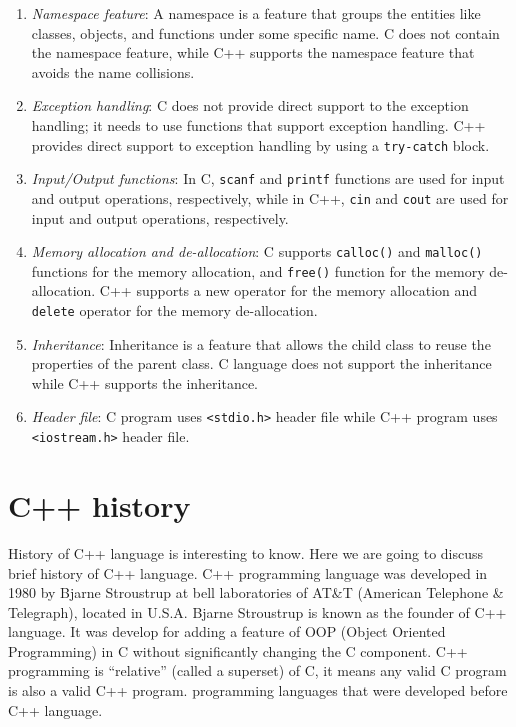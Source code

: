 \documentclass{book}
\begin{document}
\begin{enumerate}
\item \textit{Namespace feature}: A namespace is a feature that groups the entities like classes, objects, and functions under some specific name. C does not contain the namespace feature, while C++ supports the namespace feature that avoids the name collisions.
\item \textit{Exception handling}: C does not provide direct support to the exception handling; it needs to use functions that support exception handling. C++ provides direct support to exception handling by using a \texttt{try-catch} block.
\item \textit{Input/Output functions}: In C, \texttt{scanf} and \texttt{printf} functions are used for input and output operations, respectively, while in C++, \texttt{cin} and \texttt{cout} are used for input and output operations, respectively.
\item \textit{Memory allocation and de-allocation}: C supports \texttt{calloc()} and \texttt{malloc()} functions for the memory allocation, and \texttt{free()} function for the memory de-allocation. C++ supports a new operator for the memory allocation and \texttt{delete} operator for the memory de-allocation.
\item \textit{Inheritance}: Inheritance is a feature that allows the child class to reuse the properties of the parent class. C language does not support the inheritance while C++ supports the inheritance.
\item \textit{Header file}: C program uses \texttt{<stdio.h>} header file while C++ program uses \texttt{<iostream.h>} header file.
\end{enumerate}

\section{C++ history}

History of C++ language is interesting to know. Here we are going to discuss brief history of C++ language. C++ programming language was developed in 1980 by Bjarne Stroustrup at bell laboratories of AT&T (American Telephone & Telegraph), located in U.S.A. Bjarne Stroustrup is known as the founder of C++ language. It was develop for adding a feature of OOP (Object Oriented Programming) in C without significantly changing the C component. C++ programming is \enquote{relative} (called a superset) of C, it means any valid C program is also a valid C++ program. programming languages that were developed before C++ language.
\end{document}
